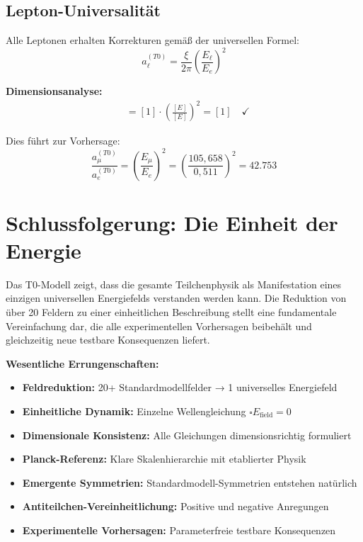 \documentclass[12pt,a4paper]{report}
\begin{document}
	\subsection{Lepton-Universalität}
	\label{subsec:lepton_universality}
	
	Alle Leptonen erhalten Korrekturen gemäß der universellen Formel:
	\begin{equation}
		a_\ell^{(T0)} = \frac{\xi}{2\pi} \left(\frac{E_\ell}{E_e}\right)^2
	\end{equation}
	
	\textbf{Dimensionsanalyse:}
	\begin{align}
		[a_\ell^{(T0)}] &= [1] \cdot \left(\frac{[E]}{[E]}\right)^2 = [1] \quad \checkmark
	\end{align}
	
	Dies führt zur Vorhersage:
	\begin{equation}
		\frac{a_\mu^{(T0)}}{a_e^{(T0)}} = \left(\frac{E_\mu}{E_e}\right)^2 = \left(\frac{105,658}{0,511}\right)^2 = 42.753
	\end{equation}
	
	\section{Schlussfolgerung: Die Einheit der Energie}
	\label{sec:conclusion_unity}
	
	Das T0-Modell zeigt, dass die gesamte Teilchenphysik als Manifestation eines einzigen universellen Energiefelds verstanden werden kann. Die Reduktion von über 20 Feldern zu einer einheitlichen Beschreibung stellt eine fundamentale Vereinfachung dar, die alle experimentellen Vorhersagen beibehält und gleichzeitig neue testbare Konsequenzen liefert.
	
	\textbf{Wesentliche Errungenschaften:}
	\begin{itemize}
		\item \textbf{Feldreduktion:} 20+ Standardmodellfelder → 1 universelles Energiefeld
		\item \textbf{Einheitliche Dynamik:} Einzelne Wellengleichung $\square E_{\text{field}} = 0$
		\item \textbf{Dimensionale Konsistenz:} Alle Gleichungen dimensionsrichtig formuliert
		\item \textbf{Planck-Referenz:} Klare Skalenhierarchie mit etablierter Physik
		\item \textbf{Emergente Symmetrien:} Standardmodell-Symmetrien entstehen natürlich
		\item \textbf{Antiteilchen-Vereinheitlichung:} Positive und negative Anregungen
		\item \textbf{Experimentelle Vorhersagen:} Parameterfreie testbare Konsequenzen
	\end{itemize}
	
\end{document}
